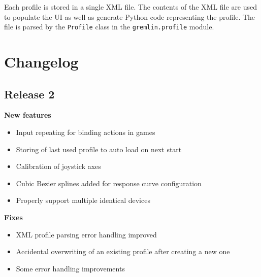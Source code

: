 \documentclass[a4, 10pt]{article}
\begin{document}
Each profile is stored in a single XML file. The contents of the XML
file are used to populate the UI as well as generate Python code
representing the profile. The file is parsed by the \verb+Profile+ class
in the \verb+gremlin.profile+ module.



\section{Changelog}

\subsection{Release 2}

\textbf{New features}
\begin{itemize}
    \item Input repeating for binding actions in games
    \item Storing of last used profile to auto load on next start
    \item Calibration of joystick axes
    \item Cubic Bezier splines added for response curve configuration
    \item Properly support multiple identical devices
\end{itemize}

\noindent \textbf{Fixes}
\begin{itemize}
    \item XML profile parsing error handling improved
    \item Accidental overwriting of an existing profile after creating a
        new one
    \item Some error handling improvements
\end{itemize}



%
%
\end{document}
